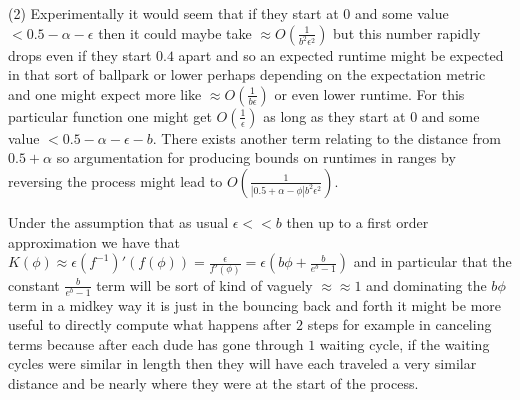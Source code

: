 (2) Experimentally it would seem that if they start at $0$ and some value $< 0.5-\alpha-\epsilon$ then it could maybe take $\approx O\left(\frac{1}{b^2\epsilon^2}\right)$ but this number rapidly drops even if they start $0.4$ apart and so an expected runtime might be expected in that sort of ballpark or lower perhaps depending on the expectation metric and one might expect more like $\approx O\left(\frac{1}{b\epsilon}\right)$ or even lower runtime. For this particular function one might get $O\left( \frac{1}{\epsilon}  \right)$ as long as they start at $0$ and some value $< 0.5-\alpha-\epsilon-b$. There exists another term relating to the distance from $0.5+\alpha$ so argumentation for producing bounds on runtimes in ranges by reversing the process might lead to $O\left( \frac{1}{|0.5+\alpha-\phi|b^2\epsilon^2} \right)$.

Under the assumption that as usual $\epsilon << b$ then up to a first order approximation we have that $K(\phi)\approx\epsilon (f^{-1})'(f(\phi))=\frac{\epsilon}{f'(\phi)}=\epsilon (b\phi + \frac{b}{e^b-1})$ and in particular that the constant $\frac{b}{e^b-1}$ term will be sort of kind of vaguely $\approx \approx 1$ and dominating the $b\phi$ term in a midkey way it is just in the bouncing back and forth it might be more useful to directly compute what happens after $2$ steps for example in canceling terms because after each dude has gone through $1$ waiting cycle, if the waiting cycles were similar in length then they will have each traveled a very similar distance and be nearly where they were at the start of the process.

